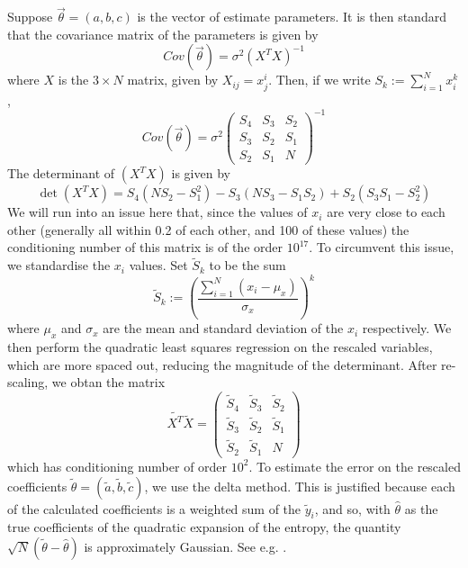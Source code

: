 \documentclass{article}
\begin{document}
Suppose $\vec{\theta} = (a,b,c)$ is the vector of estimate parameters. It is then standard that the covariance matrix of the parameters is given by
\begin{equation}
    Cov(\vec{\theta}) = \sigma^2(X^TX)^{-1}
\end{equation}
where $X$ is the $3\times N$ matrix, given by $X_{ij} = x_j^i$. Then, if we write $S_k := \sum_{i=1}^N x_i^k$,
\begin{equation}
    Cov(\vec{\theta}) = \sigma^2\left(\begin{matrix}
         S_4 &  S_3 & S_2 \\
         S_3 &  S_2 & S_1 \\
         S_2 & S_1 & N
    \end{matrix}\right)^{-1}
\end{equation}
The determinant of $(X^TX)$ is given by
\begin{equation}
    \det(X^TX) = S_4(NS_2-S_1^2) - S_3(NS_3 - S_1S_2) + S_2(S_3S_1-S_2^2)
\end{equation}
We will run into an issue here that, since the values of $x_i$ are very close to each other (generally all within 0.2 of each other, and 100 of these values) the conditioning number of this matrix is of the order $10^{17}$. To circumvent this issue, we standardise the $x_i$ values. Set $\tilde{S}_k$ to be the sum 
\begin{equation}
    \tilde{S}_k := \left(\frac{\sum_{i=1}^N (x_i - \mu_x)}{\sigma_x}\right)^k
\end{equation}
where $\mu_x$ and $\sigma_x$ are the mean and standard deviation of the $x_i$ respectively. We then perform the quadratic least squares regression on the rescaled variables, which are more spaced out, reducing the magnitude of the determinant. After re-scaling, we obtan the matrix
\begin{equation}
    \tilde{X^T}{\tilde{X}} = \left(\begin{matrix}
        \tilde{S}_4 & \tilde{S}_3 & \tilde{S}_2 \\
        \tilde{S}_3 & \tilde{S}_2 & \tilde{S}_1 \\
        \tilde{S}_2 & \tilde{S}_1 & N
    \end{matrix}\right)
\end{equation}
which has conditioning number of order $10^2$. To estimate the error on the rescaled coefficients $\tilde{\theta} = (\tilde{a}, \tilde{b}, \tilde{c})$, we use the delta method. This is justified because each of the calculated coefficients is a weighted sum of the $\tilde{y}_i$, and so, with $\hat{\theta}$ as the true coefficients of the quadratic expansion of the entropy, the quantity $\sqrt{N}(\tilde{\theta} - \hat{\theta})$ is approximately Gaussian. See e.g. \cite{bishop1975discrete}.
\end{document}
